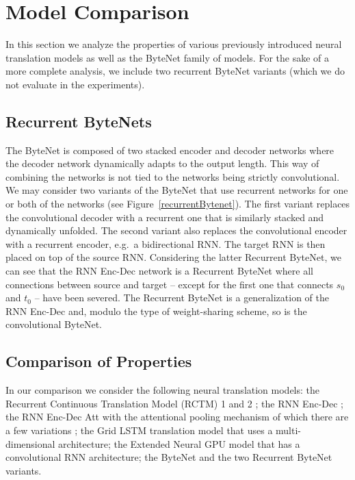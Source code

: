 \section{Model Comparison}
\label{modelcomp}

In this section we analyze the properties of various previously introduced neural translation models as well as the ByteNet family of models. For the sake of a more complete analysis, we include two recurrent ByteNet variants (which we do not evaluate in the experiments).

\subsection{Recurrent ByteNets} The ByteNet is composed of two stacked encoder and decoder networks where the decoder network dynamically adapts to the output length. This way of combining the networks is not tied to the networks being strictly convolutional. We may consider two variants of the ByteNet that use recurrent networks for one or both of the networks (see Figure~\ref{recurrentBytenet}).
The first variant replaces the convolutional decoder with a recurrent one that is similarly stacked and dynamically unfolded. The second variant also replaces the convolutional encoder with a recurrent encoder, e.g.\ a bidirectional RNN. The target RNN is then placed on top of the source RNN. Considering the latter Recurrent ByteNet, we can see that the  RNN Enc-Dec network  \citep{DBLP:conf/nips/SutskeverVL14,DBLP:journals/corr/ChoMGBSB14}  is a Recurrent ByteNet where all connections between source and target -- except for the first one that connects $s_0$ and $t_0$ -- have been severed. The Recurrent ByteNet is a generalization of the RNN Enc-Dec and, modulo the type of weight-sharing scheme, so is the convolutional ByteNet. 

\subsection{Comparison of Properties}

In our comparison we consider the following neural translation models: the Recurrent Continuous Translation Model (RCTM) 1 and 2 \citep{kalchbrenner13emnlp}; the RNN Enc-Dec \citep{DBLP:conf/nips/SutskeverVL14,DBLP:journals/corr/ChoMGBSB14}; the RNN Enc-Dec Att with the attentional pooling mechanism \citep{DBLP:journals/corr/BahdanauCB14} of which there are a few variations \citep{luong-pham-manning:2015:EMNLP,chung2016hierarchical}; the Grid LSTM translation model \citep{DBLP:journals/corr/KalchbrennerDG15} that uses a multi-dimensional architecture; the Extended Neural GPU model \citep{kaiser2016active} that has a convolutional RNN architecture; the ByteNet and the two Recurrent ByteNet variants.

